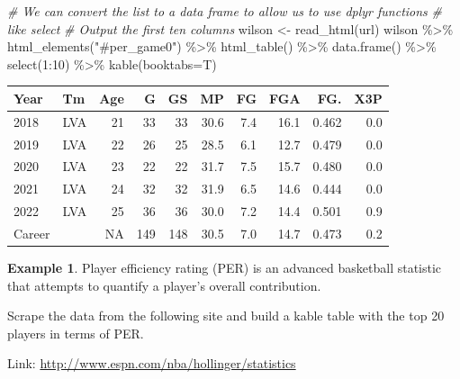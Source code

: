 \documentclass[
  11pt,
]{book}
\newenvironment{Shaded}{\begin{snugshade}}{\end{snugshade}}
\newcommand{\AttributeTok}[1]{\textcolor[rgb]{0.77,0.63,0.00}{#1}}
\newcommand{\CommentTok}[1]{\textcolor[rgb]{0.56,0.35,0.01}{\textit{#1}}}
\newcommand{\DecValTok}[1]{\textcolor[rgb]{0.00,0.00,0.81}{#1}}
\newcommand{\FunctionTok}[1]{\textcolor[rgb]{0.00,0.00,0.00}{#1}}
\newcommand{\NormalTok}[1]{#1}
\newcommand{\OtherTok}[1]{\textcolor[rgb]{0.56,0.35,0.01}{#1}}
\newcommand{\SpecialCharTok}[1]{\textcolor[rgb]{0.00,0.00,0.00}{#1}}
\newcommand{\StringTok}[1]{\textcolor[rgb]{0.31,0.60,0.02}{#1}}
\theoremstyle{definition}
\theoremstyle{definition}
\newtheorem{example}{Example}[chapter]
\theoremstyle{definition}
\theoremstyle{definition}
\theoremstyle{remark}
\begin{document}
\newpage

\begin{Shaded}
\begin{Highlighting}[]
\CommentTok{\# We can convert the list to a data frame to allow us to use dplyr functions}
\CommentTok{\# like select}
\CommentTok{\# Output the first ten columns}
\NormalTok{wilson }\OtherTok{\textless{}{-}} \FunctionTok{read\_html}\NormalTok{(url)}
\NormalTok{wilson }\SpecialCharTok{\%\textgreater{}\%} 
  \FunctionTok{html\_elements}\NormalTok{(}\StringTok{"\#per\_game0"}\NormalTok{) }\SpecialCharTok{\%\textgreater{}\%} 
  \FunctionTok{html\_table}\NormalTok{() }\SpecialCharTok{\%\textgreater{}\%} 
  \FunctionTok{data.frame}\NormalTok{() }\SpecialCharTok{\%\textgreater{}\%}
  \FunctionTok{select}\NormalTok{(}\DecValTok{1}\SpecialCharTok{:}\DecValTok{10}\NormalTok{) }\SpecialCharTok{\%\textgreater{}\%}
  \FunctionTok{kable}\NormalTok{(}\AttributeTok{booktabs=}\NormalTok{T)}
\end{Highlighting}
\end{Shaded}

\begin{tabular}{llrrrrrrrr}
\toprule
Year & Tm & Age & G & GS & MP & FG & FGA & FG. & X3P\\
\midrule
2018 & LVA & 21 & 33 & 33 & 30.6 & 7.4 & 16.1 & 0.462 & 0.0\\
2019 & LVA & 22 & 26 & 25 & 28.5 & 6.1 & 12.7 & 0.479 & 0.0\\
2020 & LVA & 23 & 22 & 22 & 31.7 & 7.5 & 15.7 & 0.480 & 0.0\\
2021 & LVA & 24 & 32 & 32 & 31.9 & 6.5 & 14.6 & 0.444 & 0.0\\
2022 & LVA & 25 & 36 & 36 & 30.0 & 7.2 & 14.4 & 0.501 & 0.9\\
\addlinespace
Career &  & NA & 149 & 148 & 30.5 & 7.0 & 14.7 & 0.473 & 0.2\\
\bottomrule
\end{tabular}

\newpage

\begin{example}
Player efficiency rating (PER) is an advanced basketball statistic that attempts to quantify a player's overall contribution.

Scrape the data from the following site and build a kable table with the top 20 players in terms of PER.

Link: \url{http://www.espn.com/nba/hollinger/statistics}
\end{example}
\end{document}
